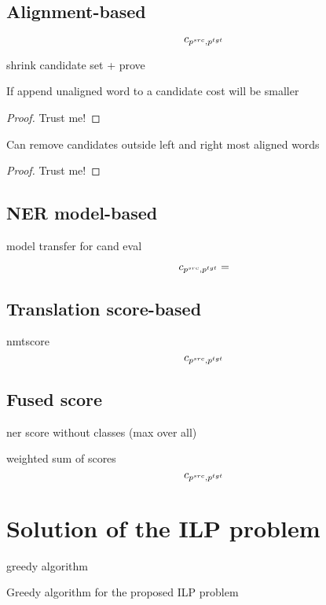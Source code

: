 \subsection{Alignment-based}

\begin{equation} \label{eq:align_cost}
    c_{p^{src}, p^{tgt}}
\end{equation}

shrink candidate set + prove

\begin{lemma}
    If append unaligned word to a candidate cost will be smaller
\end{lemma}
\begin{proof}
    Trust me!
\end{proof}

\begin{theorem}
    Can remove candidates outside left and right most aligned words
\end{theorem}
\begin{proof}
    Trust me!
\end{proof}

\subsection{NER model-based}

model transfer for cand eval

\begin{equation} \label{eq:ner_cost}
    c_{p^{src}, p^{tgt}} =
\end{equation}

\subsection{Translation score-based}

nmtscore
\begin{equation} \label{eq:nmt_cost}
    c_{p^{src}, p^{tgt}}
\end{equation}

\subsection{Fused score}

ner score without classes (max over all)

weighted sum of scores
\begin{equation} \label{eq:fused_cost}
    c_{p^{src}, p^{tgt}}
\end{equation}

\section{Solution of the ILP problem}

greedy algorithm
\begin{algorithm}
    \caption{Greedy algorithm for the proposed ILP problem} \label{alg:ilp_greedy}
\end{algorithm}